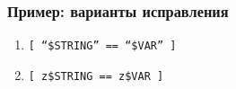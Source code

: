 \begin{frame}
	\frametitle{Пример: варианты исправления}

		\begin{enumerate}
			\item {\tt [ ``\$STRING'' == ``\$VAR'' ] }
			\item {\tt [ z\$STRING == z\$VAR ] }
		\end{enumerate}

\end{frame}
